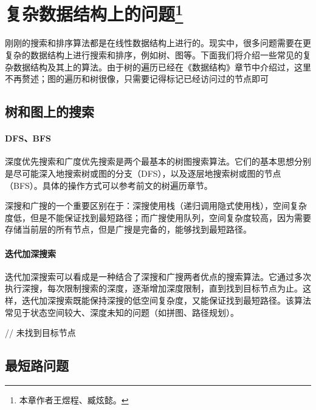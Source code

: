 \section[复杂数据结构上的问题]{复杂数据结构上的问题\protect\footnote{本章作者王煜程、臧炫懿。}}

刚刚的搜索和排序算法都是在线性数据结构上进行的。现实中，很多问题需要在更复杂的数据结构上进行搜索和排序，例如树、图等。下面我们将介绍一些常见的复杂数据结构及其上的算法。由于树的遍历已经在《数据结构》章节中介绍过，这里不再赘述；图的遍历和树很像，只需要记得标记已经访问过的节点即可

\subsection{树和图上的搜索}

\paragraph{DFS、BFS} 深度优先搜索和广度优先搜索是两个最基本的树图搜索算法。它们的基本思想分别是尽可能深入地搜索树或图的分支（DFS），以及逐层地搜索树或图的节点（BFS）。具体的操作方式可以参考前文的树遍历章节。

深搜和广搜的一个重要区别在于：深搜使用栈（递归调用隐式使用栈），空间复杂度低，但是不能保证找到最短路径；而广搜使用队列，空间复杂度较高，因为需要存储当前层的所有节点，但是广搜是完备的，能够找到最短路径。

\paragraph{迭代加深搜索} 迭代加深搜索可以看成是一种结合了深搜和广搜两者优点的搜索算法。它通过多次执行深搜，每次限制搜索的深度，逐渐增加深度限制，直到找到目标节点为止。这样，迭代加深搜索既能保持深搜的低空间复杂度，又能保证找到最短路径。该算法常见于状态空间较大、深度未知的问题（如拼图、路径规划）。
\begin{algorithm}[htbp]
    \caption{迭代加深搜索算法}
    \; // 未找到目标节点
\end{algorithm}

\subsection{最短路问题}

